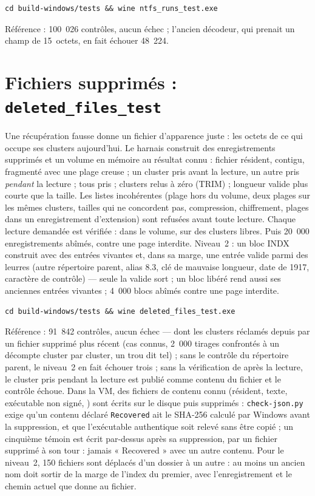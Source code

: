 \documentclass[11pt,a4paper,oneside]{report}
\begin{document}
\begin{lstlisting}
cd build-windows/tests && wine ntfs_runs_test.exe
\end{lstlisting}

Référence : 100~026 contrôles, aucun échec ; l'ancien décodeur, qui prenait un
champ de 15~octets, en fait échouer 48~224.

\section{Fichiers supprimés : \texttt{deleted\_files\_test}}

Une récupération fausse donne un fichier d'apparence juste : les octets de ce
qui occupe ses clusters aujourd'hui. Le harnais construit des enregistrements
supprimés et un volume en mémoire au résultat connu : fichier résident,
contigu, fragmenté avec une plage creuse ; un cluster pris avant la lecture,
un autre pris \emph{pendant} la lecture ; tous pris ; clusters relus à zéro
(TRIM) ; longueur valide plus courte que la taille. Les listes incohérentes
(plage hors du volume, deux plages sur les mêmes clusters, tailles qui ne
concordent pas, compression, chiffrement, plages dans un enregistrement
d'extension) sont refusées avant toute lecture. Chaque lecture demandée est
vérifiée : dans le volume, sur des clusters libres. Puis 20~000
enregistrements abîmés, contre une page interdite. Niveau~2 : un bloc INDX
construit avec des entrées vivantes et, dans sa marge, une entrée valide
parmi des leurres (autre répertoire parent, alias 8.3, clé de mauvaise
longueur, date de 1917, caractère de contrôle) — seule la valide sort ; un
bloc libéré rend aussi ses anciennes entrées vivantes ; 4~000 blocs abîmés
contre une page interdite.

\begin{lstlisting}
cd build-windows/tests && wine deleted_files_test.exe
\end{lstlisting}

Référence : 91~842 contrôles, aucun échec — dont les clusters réclamés depuis par un fichier supprimé plus récent (cas connus, 2~000 tirages confrontés à un décompte cluster par cluster, un trou dit tel) ; sans le contrôle du répertoire
parent, le niveau~2 en fait échouer trois ; sans la vérification de
 après la lecture, le cluster pris pendant la lecture est
publié comme contenu du fichier et le contrôle échoue. Dans la VM, des
fichiers de contenu connu (résident, texte, exécutable non signé,
) sont écrits sur le disque puis supprimés :
\texttt{check-json.py} exige qu'un contenu déclaré \texttt{Recovered} ait le
SHA-256 calculé par Windows avant la suppression, et que l'exécutable
authentique soit relevé sans être copié ; un cinquième témoin est écrit
par-dessus après sa suppression, par un fichier supprimé à son tour : jamais
« Recovered » avec un autre contenu. Pour le niveau~2, 150 fichiers sont
déplacés d'un dossier à un autre : au moins un ancien nom doit sortir de la
marge de l'index du premier, avec l'enregistrement et le chemin actuel que
 donne au fichier.
\end{document}
